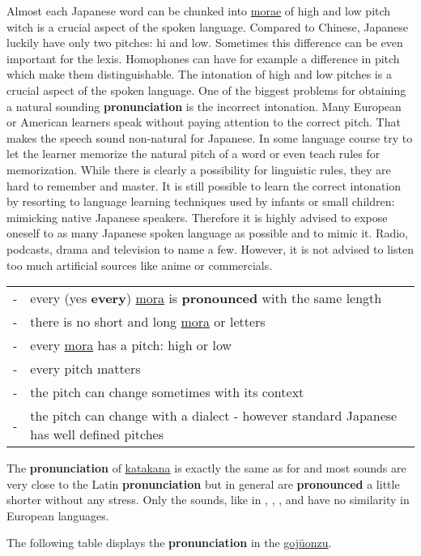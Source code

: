 Almost each Japanese word can be chunked into \hyperref[sec:Mora]{morae} of
high and low pitch witch is a crucial aspect of the spoken language. Compared
to Chinese, Japanese luckily have only two pitches: hi and low. Sometimes this
difference can be even important for the lexis. Homophones can have for example
a difference in pitch which make them distinguishable.  The intonation of high
and low pitches is a crucial aspect of the spoken language. One of the biggest
problems for obtaining a natural sounding \textbf{pronunciation} is the
incorrect intonation. Many European or American learners speak without paying
attention to the correct pitch. That makes the speech sound non-natural for
Japanese. In some language course try to let the learner memorize the natural
pitch of a word or even teach rules for memorization. While there is clearly a
possibility for linguistic rules, they are hard to remember and master.  It is
still possible to learn the correct intonation by resorting to language
learning techniques used by infants or small children: mimicking native
Japanese speakers. Therefore it is highly advised to expose oneself to as many
Japanese spoken language as possible and to mimic it. Radio, podcasts, drama
and television to name a few. However, it is not advised to listen too much
artificial sources like anime or commercials.

\bigskip
\begin{tabular}{rl}
-&every (yes \textbf{every}) \hyperref[sec:Mora]{mora} is \textbf{pronounced}
  with the same length\\
-&there is no short and long \hyperref[sec:Mora]{mora} or letters\\
-&every \hyperref[sec:Mora]{mora} has a pitch: high or low\\
-&every pitch matters\\
-&the pitch can change  sometimes with its context\\
-&the pitch can change with a dialect - however standard Japanese has well
  defined pitches\\
\end{tabular}

\bigskip

The \textbf{pronunciation} of \hyperref[sec:Katakana]{katakana} is exactly the
same as for \hyperref[sec:\jscript]{\jtopic} and most sounds are very close to
the Latin \textbf{pronunciation} but in general are \textbf{pronounced} a
little shorter without any stress. Only the  sounds, like in ,
, ,  and  have no similarity in European
languages.



The following table displays the \textbf{pronunciation} in the
\hyperref[sec:Gojuonzu]{gojūonzu}.



